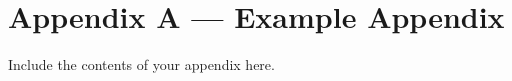 

\section*{Appendix A — Example Appendix}
\label{sec:appendix-a}

Include the contents of your appendix here.
